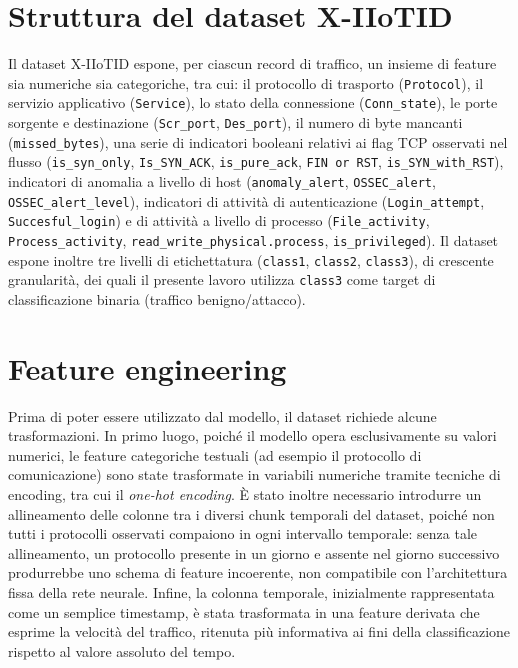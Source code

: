 \documentclass[12pt,a4paper]{report}
\begin{document}
\section{Struttura del dataset X-IIoTID}

Il dataset X-IIoTID espone, per ciascun record di traffico, un insieme di feature sia numeriche sia categoriche, tra cui: il protocollo di trasporto (\texttt{Protocol}), il servizio applicativo (\texttt{Service}), lo stato della connessione (\texttt{Conn\_state}), le porte sorgente e destinazione (\texttt{Scr\_port}, \texttt{Des\_port}), il numero di byte mancanti (\texttt{missed\_bytes}), una serie di indicatori booleani relativi ai flag TCP osservati nel flusso (\texttt{is\_syn\_only}, \texttt{Is\_SYN\_ACK}, \texttt{is\_pure\_ack}, \texttt{FIN or RST}, \texttt{is\_SYN\_with\_RST}), indicatori di anomalia a livello di host (\texttt{anomaly\_alert}, \texttt{OSSEC\_alert}, \texttt{OSSEC\_alert\_level}), indicatori di attività di autenticazione (\texttt{Login\_attempt}, \texttt{Succesful\_login}) e di attività a livello di processo (\texttt{File\_activity}, \texttt{Process\_activity}, \texttt{read\_write\_physical.process}, \texttt{is\_privileged}). Il dataset espone inoltre tre livelli di etichettatura (\texttt{class1}, \texttt{class2}, \texttt{class3}), di crescente granularità, dei quali il presente lavoro utilizza \texttt{class3} come target di classificazione binaria (traffico benigno/attacco).

\section{Feature engineering}

Prima di poter essere utilizzato dal modello, il dataset richiede alcune trasformazioni. In primo luogo, poiché il modello opera esclusivamente su valori numerici, le feature categoriche testuali (ad esempio il protocollo di comunicazione) sono state trasformate in variabili numeriche tramite tecniche di encoding, tra cui il \emph{one-hot encoding}. È stato inoltre necessario introdurre un allineamento delle colonne tra i diversi chunk temporali del dataset, poiché non tutti i protocolli osservati compaiono in ogni intervallo temporale: senza tale allineamento, un protocollo presente in un giorno e assente nel giorno successivo produrrebbe uno schema di feature incoerente, non compatibile con l'architettura fissa della rete neurale. Infine, la colonna temporale, inizialmente rappresentata come un semplice timestamp, è stata trasformata in una feature derivata che esprime la velocità del traffico, ritenuta più informativa ai fini della classificazione rispetto al valore assoluto del tempo.
\end{document}
